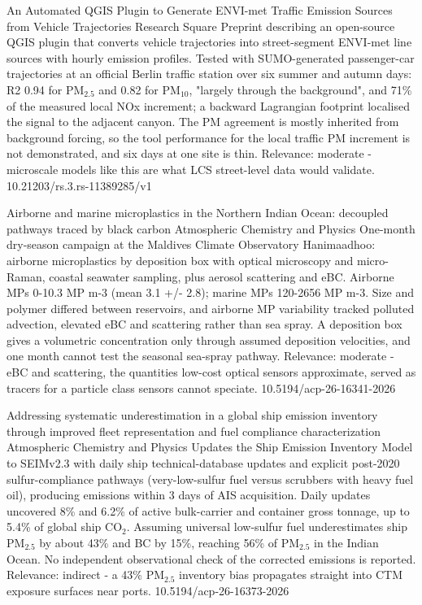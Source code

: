 \documentclass[10pt]{article}
\begin{document}
{An Automated QGIS Plugin to Generate ENVI-met Traffic Emission Sources from Vehicle Trajectories}
{Research Square}
{Preprint describing an open-source QGIS plugin that converts vehicle trajectories into street-segment ENVI-met line sources with hourly emission profiles. Tested with SUMO-generated passenger-car trajectories at an official Berlin traffic station over six summer and autumn days: R2 0.94 for PM$_{2.5}$ and 0.82 for PM$_{10}$, "largely through the background", and 71\% of the measured local NOx increment; a backward Lagrangian footprint localised the signal to the adjacent canyon. The PM agreement is mostly inherited from background forcing, so the tool performance for the local traffic PM increment is not demonstrated, and six days at one site is thin. Relevance: moderate - microscale models like this are what LCS street-level data would validate.}
{10.21203/rs.3.rs-11389285/v1}

{Airborne and marine microplastics in the Northern Indian Ocean: decoupled pathways traced by black carbon}
{Atmospheric Chemistry and Physics}
{One-month dry-season campaign at the Maldives Climate Observatory Hanimaadhoo: airborne microplastics by deposition box with optical microscopy and micro-Raman, coastal seawater sampling, plus aerosol scattering and eBC. Airborne MPs 0-10.3 MP m-3 (mean 3.1 +/- 2.8); marine MPs 120-2656 MP m-3. Size and polymer differed between reservoirs, and airborne MP variability tracked polluted advection, elevated eBC and scattering rather than sea spray. A deposition box gives a volumetric concentration only through assumed deposition velocities, and one month cannot test the seasonal sea-spray pathway. Relevance: moderate - eBC and scattering, the quantities low-cost optical sensors approximate, served as tracers for a particle class sensors cannot speciate.}
{10.5194/acp-26-16341-2026}

{Addressing systematic underestimation in a global ship emission inventory through improved fleet representation and fuel compliance characterization}
{Atmospheric Chemistry and Physics}
{Updates the Ship Emission Inventory Model to SEIMv2.3 with daily ship technical-database updates and explicit post-2020 sulfur-compliance pathways (very-low-sulfur fuel versus scrubbers with heavy fuel oil), producing emissions within 3 days of AIS acquisition. Daily updates uncovered 8\% and 6.2\% of active bulk-carrier and container gross tonnage, up to 5.4\% of global ship CO$_2$. Assuming universal low-sulfur fuel underestimates ship PM$_{2.5}$ by about 43\% and BC by 15\%, reaching 56\% of PM$_{2.5}$ in the Indian Ocean. No independent observational check of the corrected emissions is reported. Relevance: indirect - a 43\% PM$_{2.5}$ inventory bias propagates straight into CTM exposure surfaces near ports.}
{10.5194/acp-26-16373-2026}
\end{document}
